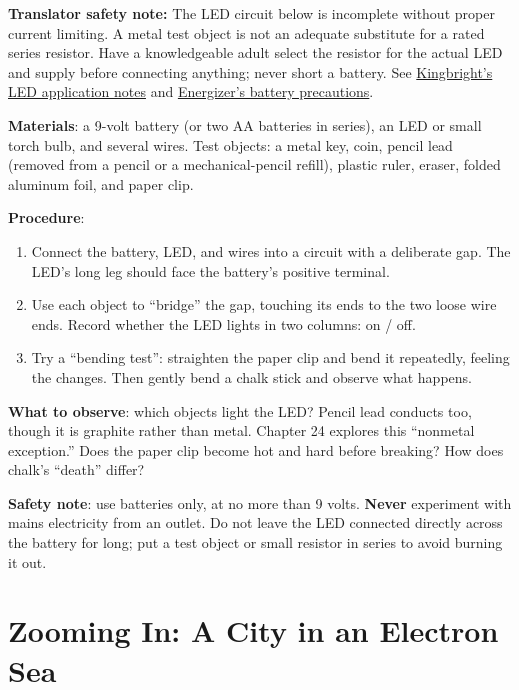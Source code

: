\begin{shiyan}
\textbf{Translator safety note:} The LED circuit below is incomplete without proper current limiting. A metal test object is not an adequate substitute for a rated series resistor. Have a knowledgeable adult select the resistor for the actual LED and supply before connecting anything; never short a battery. See \href{https://www.kingbrightusa.com/applicationnotes/ApplicationNotesFor_SMD_LEDs.pdf}{Kingbright's LED application notes} and \href{https://oem.energizer.com/english/dos-donts/}{Energizer's battery precautions}.

\textbf{Materials}: a 9-volt battery (or two AA batteries in series), an LED or small torch bulb, and several wires. Test objects: a metal key, coin, pencil lead (removed from a pencil or a mechanical-pencil refill), plastic ruler, eraser, folded aluminum foil, and paper clip.

\textbf{Procedure}:
\begin{enumerate}[itemsep=1pt]
\item Connect the battery, LED, and wires into a circuit with a deliberate gap. The LED's long leg should face the battery's positive terminal.
\item Use each object to ``bridge'' the gap, touching its ends to the two loose wire ends. Record whether the LED lights in two columns: on / off.
\item Try a ``bending test'': straighten the paper clip and bend it repeatedly, feeling the changes. Then gently bend a chalk stick and observe what happens.
\end{enumerate}

\textbf{What to observe}: which objects light the LED? Pencil lead conducts too, though it is graphite rather than metal. Chapter 24 explores this ``nonmetal exception.'' Does the paper clip become hot and hard before breaking? How does chalk's ``death'' differ?

\textbf{Safety note}: use batteries only, at no more than 9 volts. \textbf{Never} experiment with mains electricity from an outlet. Do not leave the LED connected directly across the battery for long; put a test object or small resistor in series to avoid burning it out.
\end{shiyan}

\section{Zooming In: A City in an Electron Sea}

